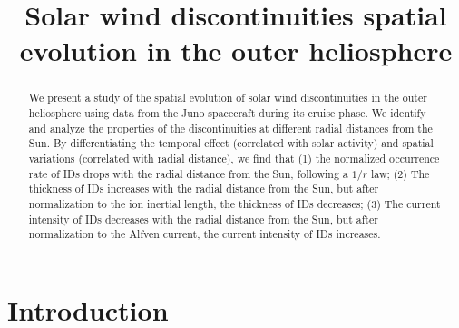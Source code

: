 \documentclass[
]{agujournal2019}
\begin{document}
\title{Solar wind discontinuities spatial evolution in the outer heliosphere}



\begin{abstract}
We present a study of the spatial evolution of solar wind discontinuities in the outer heliosphere using data from the Juno spacecraft during its cruise phase. We identify and analyze the properties of the discontinuities at different radial distances from the Sun. By differentiating the temporal effect (correlated with solar activity) and spatial variations (correlated with radial distance), we find that (1) the normalized occurrence rate of IDs drops with the radial distance from the Sun, following a \(1/r\) law; (2) The thickness of IDs increases with the radial distance from the Sun, but after normalization to the ion inertial length, the thickness of IDs decreases; (3) The current intensity of IDs decreases with the radial distance from the Sun, but after normalization to the Alfven current, the current intensity of IDs increases.
\end{abstract}




\section{Introduction}\label{introduction}
\end{document}
